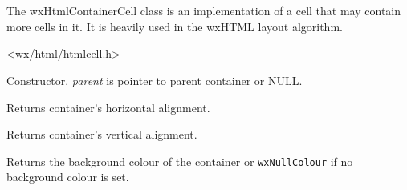 
\section{}\label{wxhtmlcontainercell}

The wxHtmlContainerCell class is an implementation of a cell that may
contain more cells in it. It is heavily used in the wxHTML layout algorithm.




<wx/html/htmlcell.h>




\label{wxhtmlcontainercellwxhtmlcontainercell}


Constructor. {\it parent} is pointer to parent container or NULL.


\label{wxhtmlcontainercellgetalignhor}


Returns container's horizontal alignment.

\label{wxhtmlcontainercellgetalignver}


Returns container's vertical alignment.

\label{wxhtmlcontainercellgetbackgroundcolour}


Returns the background colour of the container or {\tt wxNullColour} if no background
colour is set.


